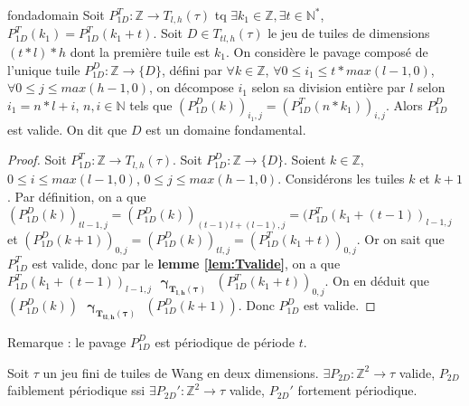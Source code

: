 \documentclass[a4paper,10pt,oneside]{article} %
\begin{document}
\begin{Lemme}{}{fondadomain}
Soit $P_{1D}^T : \mathds{Z} \rightarrow T_{l, h}(\tau)$ tq $\exists k_1 \in \mathds{Z}, \exists t \in \mathds{N}^*$, $P_{1D}^T(k_1) = P_{1D}^T(k_1+t)$. Soit $D \in T_{tl,h}(\tau)$ le jeu de tuiles de dimensions $(t*l)*h$ dont la première tuile est $k_1$. On considère le pavage composé de l'unique tuile $P_{1D}^D : \mathds{Z} \rightarrow \{D\}$, défini par $\forall k \in \mathds{Z}$, $\forall 0 \leq i_1 \leq t*max(l - 1,0)$, $\forall 0 \leq j \leq max(h-1, 0)$, on décompose $i_1$ selon sa division entière par $l$ selon $i_1 = n*l+i$, $n, i \in \mathds{N}$ tels que $(P_{1D}^D(k))_{i_1,j} = (P_{1D}^T(n*k_1))_{i,j}$. Alors $P_{1D}^D$ est valide. On dit que $D$ est un domaine fondamental.


\end{Lemme}

\begin{proof}

Soit $P_{1D}^T : \mathds{Z} \rightarrow T_{l, h}(\tau)$. Soit $P_{1D}^D : \mathds{Z} \rightarrow \{D\}$. Soient $k \in \mathds{Z}$, $ 0 \leq i \leq max(l - 1,0)$, $ 0 \leq j \leq max(h-1, 0)$. Considérons les tuiles $k$ et $k+1$. Par définition, on a que $(P_{1D}^D(k))_{tl-1,j} = (P_{1D}^D(k))_{(t-1)l+(l-1),j} = (P_{1D}^T(k_1 + (t-1))_{l-1,j}$ et $(P_{1D}^D(k+1))_{0,j} = (P_{1D}^D(k))_{tl,j} = (P_{1D}^T(k_1+t))_{0,j}$. Or on sait que $P_{1D}^T$ est valide, donc par le \textbf{lemme \ref{lem:Tvalide}}, on a que $P_{1D}^T(k_1 + (t-1))_{l-1,j} \text{ } \bm{\gamma_{T_{l,h}(\tau)}} \text{ } (P_{1D}^T(k_1+t))_{0,j}$. On en déduit que $(P_{1D}^D(k)) \text{ } \bm{\gamma_{T_{tl,h}(\tau)}} \text{ } (P_{1D}^D(k+1))$. Donc $P_{1D}^D$ est valide.
\end{proof}

Remarque : le pavage $P_{1D}^D$ est périodique de période $t$.








\begin{Theoreme}{}{}
Soit $\tau$ un jeu fini de tuiles de Wang en deux dimensions.
$\exists P_{2D} : \mathds{Z}^2 \rightarrow \tau$ valide, $P_{2D}$ faiblement périodique ssi $\exists P_{2D}' : \mathds{Z}^2 \rightarrow \tau$ valide, $P_{2D}'$ fortement périodique.
\end{Theoreme}
\end{document}
